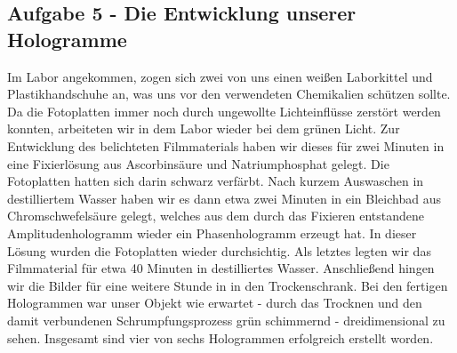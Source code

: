 \subsection*{Aufgabe 5 - Die Entwicklung unserer Hologramme}
Im Labor angekommen, zogen sich zwei von uns einen weißen Laborkittel und Plastikhandschuhe an, was uns vor den verwendeten Chemikalien schützen sollte. Da die Fotoplatten immer noch durch ungewollte Lichteinflüsse zerstört werden konnten, arbeiteten wir in dem Labor wieder bei dem grünen Licht. Zur Entwicklung des belichteten Filmmaterials haben wir dieses für zwei Minuten in eine Fixierlösung aus Ascorbinsäure und Natriumphosphat gelegt. Die Fotoplatten hatten sich darin schwarz verfärbt.
Nach kurzem Auswaschen in destilliertem Wasser haben wir es dann etwa zwei Minuten in ein Bleichbad aus Chromschwefelsäure gelegt, welches aus dem durch das Fixieren entstandene Amplitudenhologramm wieder ein Phasenhologramm erzeugt hat. In dieser Lösung wurden die Fotoplatten wieder durchsichtig. Als letztes legten wir das Filmmaterial für etwa 40 Minuten in destilliertes Wasser. Anschließend hingen wir die Bilder für eine weitere Stunde in in den Trockenschrank. Bei den fertigen Hologrammen war unser Objekt wie erwartet - durch das Trocknen und den damit verbundenen Schrumpfungsprozess grün schimmernd - dreidimensional zu sehen. Insgesamt sind vier von sechs Hologrammen erfolgreich erstellt worden.
